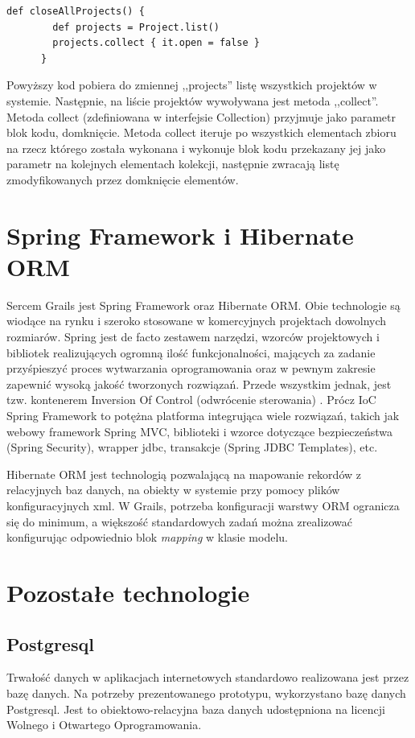     \newpage
    
    \begin{lstlisting}[caption={domknięcie w Groovy}, label={lst:closure}]
      def closeAllProjects() {
        def projects = Project.list()
        projects.collect { it.open = false }
      }
    \end{lstlisting} 
    
    Powyższy kod pobiera do zmiennej ,,projects'' listę wszystkich projektów w systemie. Następnie, na liście projektów wywoływana jest metoda ,,collect''. Metoda collect (zdefiniowana w interfejsie Collection) przyjmuje jako parametr blok kodu, domknięcie. Metoda collect iteruje po wszystkich elementach zbioru na rzecz którego została wykonana i wykonuje blok kodu przekazany jej jako parametr na kolejnych elementach kolekcji, następnie zwracają listę zmodyfikowanych przez domknięcie elementów.

    \section{Spring Framework i Hibernate ORM}

      Sercem Grails jest Spring Framework oraz Hibernate ORM. Obie technologie są wiodące na rynku i szeroko stosowane w komercyjnych projektach dowolnych rozmiarów. Spring jest de facto zestawem narzędzi, wzorców projektowych i bibliotek realizujących ogromną ilość funkcjonalności, mających za zadanie przyśpieszyć proces wytwarzania oprogramowania oraz w pewnym zakresie zapewnić wysoką jakość tworzonych rozwiązań. Przede wszystkim jednak, jest tzw. kontenerem Inversion Of Control (odwrócenie sterowania) \cite{MFow01}. Prócz IoC Spring Framework to potężna platforma integrująca wiele rozwiązań, takich jak webowy framework Spring MVC, biblioteki i wzorce dotyczące bezpieczeństwa (Spring Security), wrapper jdbc, transakcje (Spring JDBC Templates), etc.

      Hibernate ORM jest technologią pozwalającą na mapowanie rekordów z relacyjnych baz danych, na obiekty w systemie przy pomocy plików konfiguracyjnych xml. W Grails, potrzeba konfiguracji warstwy ORM ogranicza się do minimum, a większość standardowych zadań można zrealizować konfigurując odpowiednio blok \emph{mapping} w klasie modelu.

  \section{Pozostałe technologie}
    \subsection{Postgresql}
      Trwałość danych w aplikacjach internetowych standardowo realizowana jest przez bazę danych. Na potrzeby prezentowanego prototypu, wykorzystano bazę danych Postgresql. Jest to obiektowo-relacyjna baza danych udostępniona na licencji Wolnego i Otwartego Oprogramowania. 

